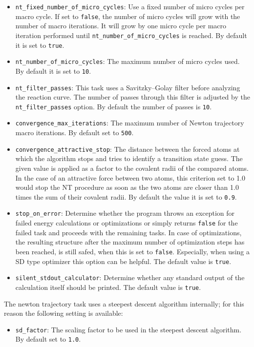 \documentclass[]{tufte-book}
\begin{document}
\begin{itemize}
\item \texttt{nt\_fixed\_number\_of\_micro\_cycles}: Use a fixed number of micro cycles per macro cycle. If set to
\texttt{false}, the number of micro cycles will grow with the number of macro iterations. It will grow by one micro
cycle per macro iteration performed until \texttt{nt\_number\_of\_micro\_cycles} is reached. By default it is set to \texttt{true}.
\item \texttt{nt\_number\_of\_micro\_cycles}: The maximum number of micro cycles used. By default it is set to \texttt{10}.
\item \texttt{nt\_filter\_passes}: This task uses a Savitzky--Golay filter before analyzing the reaction curve. The number of passes
through this filter is adjusted by the \texttt{nt\_filter\_passes} option. By default the number of passes is \texttt{10}.
\item \texttt{convergence\_max\_iterations}: The maximum number of Newton trajectory macro iterations. By default set to \texttt{500}.
\item \texttt{convergence\_attractive\_stop}: The distance between the forced atoms at which the algorithm stops and tries to identify
a transition state guess. The given value is applied as a factor to the covalent radii of the compared atoms.
In the case of an attractive force between two atoms, this criterion set to 1.0 would stop the NT procedure as soon as the two atoms
are closer than 1.0 times the sum of their covalent radii.
By default the value it is set to \texttt{0.9}.
\item \texttt{stop\_on\_error}: Determine whether the program throws an exception for failed energy calculations or optimizations or simply returns \texttt{false} for the failed task and proceeds with the remaining tasks. In case of optimizations, the resulting structure after the maximum number of optimization steps has been reached, is still safed, when this is set to \texttt{false}. Especially, when using a SD type optimizer this option can be helpful. The default value is \texttt{true}.
\item \texttt{silent\_stdout\_calculator}: Determine whether any standard output of the calculation itself should be printed. The default value is \texttt{true}.
\end{itemize}

The newton trajectory task uses a steepest descent algorithm internally; for this reason the following setting is available:
\begin{itemize}
\item \texttt{sd\_factor}: The scaling factor to be used in the steepest descent algorithm. By default set to \texttt{1.0}.
\end{itemize}
\end{document}
